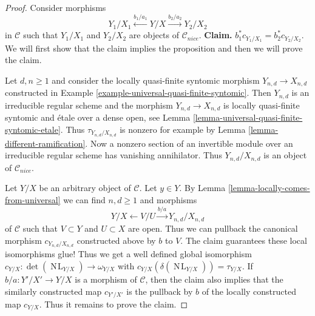 \documentclass{stacks-project}
\theoremstyle{plain}
\theoremstyle{definition}
\theoremstyle{remark}
\numberwithin{equation}{subsection}
\def\NL{\mathop{N\!L}\nolimits}
\begin{document}
\begin{proof}
\medskip\noindent
Consider morphisms
$$
Y_1/X_1 \xleftarrow{b_1/a_1} Y/X \xrightarrow{b_2/a_2} Y_2/X_2
$$
in $\mathcal{C}$ such that $Y_1/X_1$ and $Y_2/X_2$ are objects
of $\mathcal{C}_{nice}$. {\bf Claim.} $b_1^*c_{Y_1/X_1} = b_2^*c_{Y_2/X_2}$.
We will first show that the claim implies the proposition
and then we will prove the claim.

\medskip\noindent
Let $d, n \geq 1$ and consider the locally
quasi-finite syntomic morphism $Y_{n, d} \to X_{n, d}$
constructed in Example \ref{example-universal-quasi-finite-syntomic}.
Then $Y_{n, d}$ is an irreducible regular scheme and the
morphism $Y_{n, d} \to X_{n, d}$ is locally quasi-finite syntomic
and \'etale over a dense open, see
Lemma \ref{lemma-universal-quasi-finite-syntomic-etale}.
Thus $\tau_{Y_{n, d}/X_{n, d}}$ is nonzero for example by
Lemma \ref{lemma-different-ramification}. Now a nonzero section
of an invertible module over an irreducible regular scheme
has vanishing annihilator. Thus
$Y_{n, d}/X_{n, d}$ is an object of $\mathcal{C}_{nice}$.

\medskip\noindent
Let $Y/X$ be an arbitrary object of $\mathcal{C}$. Let $y \in Y$.
By Lemma \ref{lemma-locally-comes-from-universal} we can find
$n, d \geq 1$ and morphisms
$$
Y/X \leftarrow V/U \xrightarrow{b/a} Y_{n, d}/X_{n, d}
$$
of $\mathcal{C}$ such that $V \subset Y$ and $U \subset X$ are open.
Thus we can pullback the canonical morphism $c_{Y_{n, d}/X_{n, d}}$
constructed above by $b$ to $V$. The claim guarantees these local
isomorphisms glue! Thus we get a well defined global isomorphism
$c_{Y/X} : \det(\NL_{Y/X}) \to \omega_{Y/X}$ with
$c_{Y/X}(\delta(\NL_{Y/X})) = \tau_{Y/X}$.
If $b/a : Y'/X' \to Y/X$ is a morphism of $\mathcal{C}$, then
the claim also implies that the similarly constructed map
$c_{Y'/X'}$ is the pullback by $b$ of the locally constructed
map $c_{Y/X}$. Thus it remains to prove the claim.


\end{proof}
\end{document}
